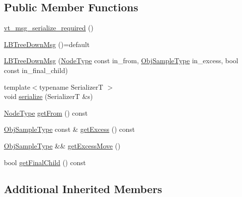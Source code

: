 \subsection*{Public Member Functions}
\begin{DoxyCompactItemize}
\item 
\hyperlink{structvt_1_1vrt_1_1collection_1_1lb_1_1_l_b_tree_down_msg_a6e7ce858dcd96d87f35726e51b7e20ae}{vt\+\_\+msg\+\_\+serialize\+\_\+required} ()
\item 
\hyperlink{structvt_1_1vrt_1_1collection_1_1lb_1_1_l_b_tree_down_msg_ab98ef9e015d68d2d6f8491d05eb1bfd4}{L\+B\+Tree\+Down\+Msg} ()=default
\item 
\hyperlink{structvt_1_1vrt_1_1collection_1_1lb_1_1_l_b_tree_down_msg_a4728ca0d578d08d8e90862a07ddf1b53}{L\+B\+Tree\+Down\+Msg} (\hyperlink{namespacevt_a866da9d0efc19c0a1ce79e9e492f47e2}{Node\+Type} const in\+\_\+from, \hyperlink{structvt_1_1vrt_1_1collection_1_1lb_1_1_hier_l_b_types_a597a60d517207b90e8c7984eac434e8f}{Obj\+Sample\+Type} in\+\_\+excess, bool const in\+\_\+final\+\_\+child)
\item 
{\footnotesize template$<$typename SerializerT $>$ }\\void \hyperlink{structvt_1_1vrt_1_1collection_1_1lb_1_1_l_b_tree_down_msg_a13f9e708fad12e306592dcbc1bf66171}{serialize} (SerializerT \&s)
\item 
\hyperlink{namespacevt_a866da9d0efc19c0a1ce79e9e492f47e2}{Node\+Type} \hyperlink{structvt_1_1vrt_1_1collection_1_1lb_1_1_l_b_tree_down_msg_af1656dcca58e338b16f856a45eb49dd3}{get\+From} () const
\item 
\hyperlink{structvt_1_1vrt_1_1collection_1_1lb_1_1_hier_l_b_types_a597a60d517207b90e8c7984eac434e8f}{Obj\+Sample\+Type} const  \& \hyperlink{structvt_1_1vrt_1_1collection_1_1lb_1_1_l_b_tree_down_msg_a262abc83d3f5df7e3971d8a837689335}{get\+Excess} () const
\item 
\hyperlink{structvt_1_1vrt_1_1collection_1_1lb_1_1_hier_l_b_types_a597a60d517207b90e8c7984eac434e8f}{Obj\+Sample\+Type} \&\& \hyperlink{structvt_1_1vrt_1_1collection_1_1lb_1_1_l_b_tree_down_msg_a73e7f5d97152582a54d54b634b9e0486}{get\+Excess\+Move} ()
\item 
bool \hyperlink{structvt_1_1vrt_1_1collection_1_1lb_1_1_l_b_tree_down_msg_aab94923c1ba77ba3fc30f5de51706b3e}{get\+Final\+Child} () const
\end{DoxyCompactItemize}
\subsection*{Additional Inherited Members}


